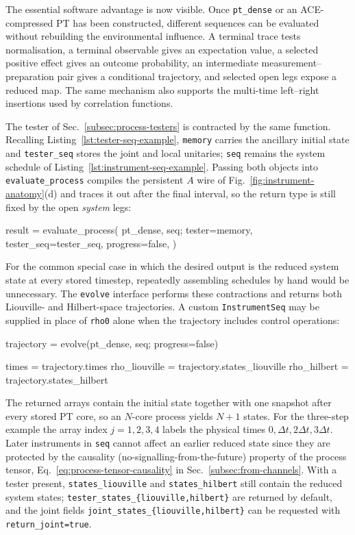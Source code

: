 The essential software advantage is now visible.
Once \texttt{pt\_dense} or an ACE-compressed PT has been constructed, different sequences can be evaluated without rebuilding the environmental influence.
A terminal trace tests normalisation, a terminal observable gives an expectation value, a selected positive effect gives an outcome probability, an intermediate measurement--preparation pair gives a conditional trajectory, and selected open legs expose a reduced map.
The same mechanism also supports the multi-time left--right insertions used by correlation functions.

The tester of Sec.~\ref{subsec:process-testers} is contracted by the same function.
Recalling Listing~\ref{lst:tester-seq-example}, \texttt{memory} carries the ancillary initial state and \texttt{tester\_seq} stores the joint and local unitaries; \texttt{seq} remains the system schedule of Listing~\ref{lst:instrument-seq-example}.
Passing both objects into \texttt{evaluate\_process} compiles the persistent \(A\) wire of Fig.~\ref{fig:instrument-anatomy}(d) and traces it out after the final interval, so the return type is still fixed by the open \emph{system} legs:
%
\begin{juliacode}[
    caption={Evaluating the process tensor against the tester of Listing~\ref{lst:tester-seq-example}.},
    label={lst:evaluate-tester},
]
result = evaluate_process(
    pt_dense,
    seq;
    tester=memory,
    tester_seq=tester_seq,
    progress=false,
)
\end{juliacode}
%

For the common special case in which the desired output is the reduced system state at every stored timestep, repeatedly assembling schedules by hand would be unnecessary.
The \texttt{evolve} interface performs these contractions and returns both Liouville- and Hilbert-space trajectories.
A custom \texttt{InstrumentSeq} may be supplied in place of \texttt{rho0} alone when the trajectory includes control operations:
%
\begin{juliacode}[
    caption={Reduced dynamics from the process tensor and the instrument sequence of Listing~\ref{lst:instrument-seq-example}.},
    label={lst:evolve-example},
]
trajectory = evolve(pt_dense, seq; progress=false)

times = trajectory.times
rho_liouville = trajectory.states_liouville
rho_hilbert = trajectory.states_hilbert
\end{juliacode}
%
The returned arrays contain the initial state together with one snapshot after every stored PT core, so an \(N\)-core process yields \(N+1\) states.
For the three-step example the array index \(j=1,2,3,4\) labels the physical times \(0,\Delta t,2\Delta t,3\Delta t\).
Later instruments in \texttt{seq} cannot affect an earlier reduced state since they are protected by the causality (no-signalling-from-the-future) property of the process tensor, Eq.~\eqref{eq:process-tensor-causality} in Sec.~\ref{subsec:from-channels}.
With a tester present, \texttt{states\_liouville} and \texttt{states\_hilbert} still contain the reduced system states; \texttt{tester\_states\_\{liouville,hilbert\}} are returned by default, and the joint fields \texttt{joint\_states\_\{liouville,hilbert\}} can be requested with \texttt{return\_joint=true}.

